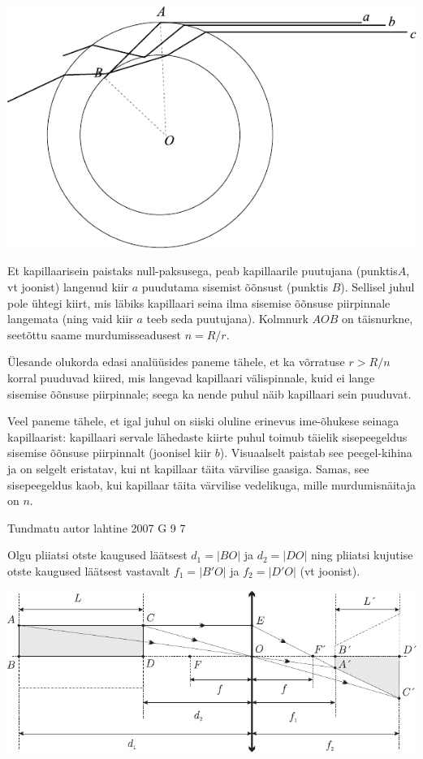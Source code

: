 \documentclass[11pt]{article}
\begin{document}
{{\ifSolution
\begin{center}
	\includegraphics[width=\linewidth]{2009-lahg-08-lah}
\end{center}

Et kapillaarisein paistaks null-paksusega, peab kapillaarile puutujana (punktis$A$, vt joonist) langenud kiir $a$ puudutama sisemist õõnsust (punktis $B$). Sellisel juhul pole ühtegi kiirt, mis läbiks kapillaari seina ilma sisemise õõnsuse piirpinnale langemata (ning vaid kiir $a$ teeb seda puutujana). Kolmnurk $AOB$ on täisnurkne, seetõttu saame murdumisseadusest $n= R/r$. 

Ülesande olukorda edasi analüüsides paneme tähele, et ka võrratuse $r> R/n$ korral puuduvad kiired, mis langevad kapillaari välispinnale, kuid ei lange sisemise õõnsuse piirpinnale; seega ka nende puhul näib kapillaari sein puuduvat. 

Veel paneme tähele, et igal juhul on siiski oluline erinevus ime-õhukese seinaga kapillaarist: kapillaari servale lähedaste kiirte puhul toimub täielik sisepeegeldus sisemise õõnsuse piirpinnalt (joonisel kiir $b$). Visuaalselt paistab see peegel-kihina ja on selgelt eristatav, kui nt kapillaar täita värvilise gaasiga. Samas, see sisepeegeldus kaob, kui kapillaar täita värvilise vedelikuga, mille murdumisnäitaja on $n$.
\fi
}

{Tundmatu autor} %
{lahtine} %
{2007} %
{G 9} %
{7} %
{

\ifSolution
Olgu pliiatsi otste kaugused läätsest $d_1 = |BO|$ ja $d_2 = |DO|$ ning pliiatsi kujutise otste kaugused läätsest vastavalt $f_1 = |B'O|$ ja $f_2 = |D'O|$ (vt joonist).

\begin{center}
	\includegraphics[width=\linewidth]{2007-lahg-09-lah}
\end{center}

}}
\end{document}
